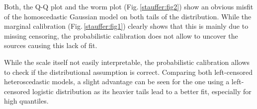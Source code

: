 \documentclass[twoside]{report}
\begin{document}
Both, the Q-Q plot and the worm plot (Fig.\,\ref{stauffer:fig2}) show an
obvious misfit of the homoscedastic Gaussian model on both tails of the
distribution. While the marginal calibration (Fig.\,\ref{stauffer:fig1})
clearly shows that this is mainly due to missing censoring, the probabilistic
calibration does not allow to uncover the sources causing this lack of fit.

While the scale itself not easily interpretable, the probabilistic calibration
allows to check if the distributional assumption is correct.  Comparing both
left-censored heteroscedastic models, a slight advantage can be seen for the
one using a left-censored logistic distribution as its heavier tails lead to a
better fit, especially for high quantiles.




%



\end{document}
